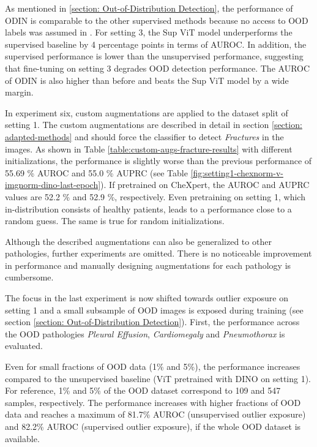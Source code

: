 As mentioned in \ref{section: Out-of-Distribution Detection}, the performance of ODIN is comparable to the other supervised methods because no access to OOD labels was assumed in \citep{Berger2021}.
For setting 3, the Sup ViT model underperforms the supervised baseline by 4 percentage points in terms of AUROC.
In addition, the supervised performance is lower than the unsupervised performance, suggesting that fine-tuning on setting 3 degrades OOD detection performance.
The AUROC of ODIN is also higher than before and beats the Sup ViT model by a wide margin.
\par
In experiment six, custom augmentations are applied to the dataset split of setting 1.
The custom augmentations are described in detail in section \ref{section: adapted-methods} and should force the classifier to detect \textit{Fractures} in the images.
As shown in Table \ref{table:custom-augs-fracture-results} with different initializations, the performance is slightly worse than the previous performance of 55.69 \% AUROC  and 55.0 \% AUPRC (see Table \ref{fig:setting1-chexnorm-v-imgnorm-dino-last-epoch}).
If pretrained on CheXpert, the AUROC and AUPRC values are 52.2 \% and 52.9 \%, respectively. 
Even pretraining on setting 1, which in-distribution consists of healthy patients, leads to a performance close to a random guess.
The same is true for random initializations.
\par
Although the described augmentations can also be generalized to other pathologies, further experiments are omitted.
There is no noticeable improvement in performance and manually designing augmentations for each pathology is cumbersome.
\par
The focus in the last experiment is now shifted towards outlier exposure on setting 1 and a small subsample of OOD images is exposed during training (see section \ref{section: Out-of-Distribution Detection}).
First, the performance across the OOD pathologies \textit{Pleural Effusion}, \textit{Cardiomegaly} and \textit{Pneumothorax} is evaluated.
\par
Even for small fractions of OOD data (1\% and 5\%), the performance increases compared to the unsupervised baseline (ViT pretrained with DINO on setting 1).
For reference, 1\% and 5\% of the OOD dataset correspond to 109 and 547 samples, respectively.
The performance increases with higher fractions of OOD data and reaches a maximum of 81.7\% AUROC (unsupervised outlier exposure) and 82.2\% AUROC (supervised outlier exposure), if the whole OOD dataset is available.

